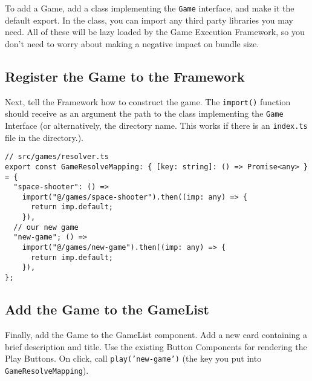 To add a Game, add a class implementing the \texttt{Game} interface, and make it the default export. In the class, you can import any third party libraries you may need. All of these will be lazy loaded by the Game Execution Framework, so you don't need to worry about making a negative impact on bundle size.

\subsection{Register the Game to the Framework}
Next, tell the Framework how to construct the game. The \texttt{import()} function should receive as an argument the path to the class implementing the \texttt{Game} Interface (or alternatively, the directory name. This works if there is an \texttt{index.ts} file in the directory.).
\begin{verbatim}
// src/games/resolver.ts
export const GameResolveMapping: { [key: string]: () => Promise<any> } = {
  "space-shooter": () =>
    import("@/games/space-shooter").then((imp: any) => {
      return imp.default;
    }),
  // our new game
  "new-game"; () =>
    import("@/games/new-game").then((imp: any) => {
      return imp.default;
    }),
};
\end{verbatim}
\subsection{Add the Game to the GameList}
Finally, add the Game to the GameList component. Add a new card containing a brief description and title. Use the existing Button Components for rendering the Play Buttons. On click, call \texttt{play('new-game')} (the key you put into \texttt{GameResolveMapping}).